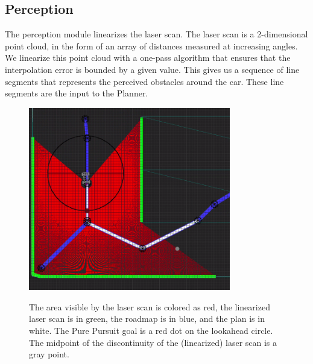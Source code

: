 \subsection{Perception}
The perception module linearizes the laser scan.
The laser scan is a 2-dimensional point cloud,
in the form of an array of distances measured at increasing angles.
We linearize this point cloud with a one-pass algorithm that ensures that
the interpolation error is bounded by a given value.
This gives us a sequence of line segments that represents the perceived obstacles around the car.
These line segments are the input to the Planner.

\begin{figure}
\centering
\includegraphics[width=88mm]{Figures/Planning.png}%
\label{fig:plan}%
\caption{The area visible by the laser scan is colored as red,
the linearized laser scan is in green,
the roadmap is in blue,
and the plan is in white.
The Pure Pursuit goal is a red dot on the lookahead circle.
The midpoint of the discontinuity of the (linearized) laser scan is a gray point.}
\end{figure}

